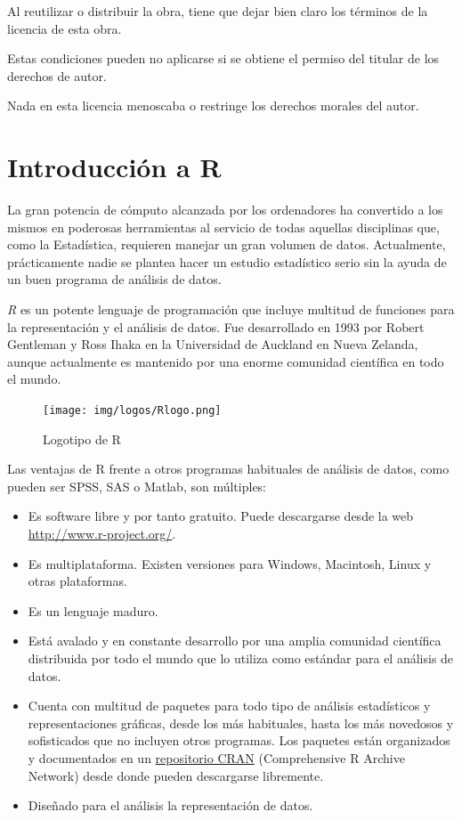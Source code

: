 \documentclass[
  a4paper,
]{scrreport}
\providecommand{\tightlist}{%
  \setlength{\itemsep}{0pt}\setlength{\parskip}{0pt}}\usepackage{longtable,booktabs,array}
\theoremstyle{definition}
\theoremstyle{definition}
\theoremstyle{remark}
\begin{document}
Al reutilizar o distribuir la obra, tiene que dejar bien claro los
términos de la licencia de esta obra.

Estas condiciones pueden no aplicarse si se obtiene el permiso del
titular de los derechos de autor.

Nada en esta licencia menoscaba o restringe los derechos morales del
autor.


\chapter{Introducción a R}\label{introducciuxf3n-a-r}

La gran potencia de cómputo alcanzada por los ordenadores ha convertido
a los mismos en poderosas herramientas al servicio de todas aquellas
disciplinas que, como la Estadística, requieren manejar un gran volumen
de datos. Actualmente, prácticamente nadie se plantea hacer un estudio
estadístico serio sin la ayuda de un buen programa de análisis de datos.

\emph{R} es un potente lenguaje de programación que incluye multitud de
funciones para la representación y el análisis de datos. Fue
desarrollado en 1993 por Robert Gentleman y Ross Ihaka en la Universidad
de Auckland en Nueva Zelanda, aunque actualmente es mantenido por una
enorme comunidad científica en todo el mundo.

\begin{figure}[H]

{\centering \texttt{[image: img/logos/Rlogo.png]}

}

\caption{Logotipo de R}

\end{figure}%

Las ventajas de R frente a otros programas habituales de análisis de
datos, como pueden ser SPSS, SAS o Matlab, son múltiples:

\begin{itemize}
\tightlist
\item
  Es software libre y por tanto gratuito. Puede descargarse desde la web
  \url{http://www.r-project.org/}.
\item
  Es multiplataforma. Existen versiones para Windows, Macintosh, Linux y
  otras plataformas.
\item
  Es un lenguaje maduro.
\item
  Está avalado y en constante desarrollo por una amplia comunidad
  científica distribuida por todo el mundo que lo utiliza como estándar
  para el análisis de datos.
\item
  Cuenta con multitud de paquetes para todo tipo de análisis
  estadísticos y representaciones gráficas, desde los más habituales,
  hasta los más novedosos y sofisticados que no incluyen otros
  programas. Los paquetes están organizados y documentados en un
  \href{https://cran.r-project.org/}{repositorio CRAN} (Comprehensive R
  Archive Network) desde donde pueden descargarse libremente.
\item
  Diseñado para el análisis la representación de datos.
\end{itemize}
\end{document}
